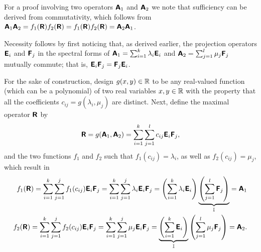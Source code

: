 {%
For a proof involving two operators $\textsf{\textbf{A}}_1$ and $\textsf{\textbf{A}}_2$ we note that
sufficiency  can be derived from   commutativity, which follows from
$
\textsf{\textbf{A}}_1\textsf{\textbf{A}}_2=f_1 (\textsf{\textbf{R}}) f_2 (\textsf{\textbf{R}}) =
f_1 (\textsf{\textbf{R}}) f_2 (\textsf{\textbf{R}})= \textsf{\textbf{A}}_2\textsf{\textbf{A}}_1
$.

Necessity follows by first noticing that, as derived earlier, the projection operators
$\textsf{\textbf{E}}_i$ and $\textsf{\textbf{F}}_j$
in the spectral forms of $\textsf{\textbf{A}}_1=\sum_{i=1}^k \lambda_i\textsf{\textbf{E}}_i$
and
$\textsf{\textbf{A}}_2=\sum_{j=1}^l \mu_j\textsf{\textbf{F}}_j$ mutually commute; that is,
$
\textsf{\textbf{E}}_i \textsf{\textbf{F}}_j
=
\textsf{\textbf{F}}_j \textsf{\textbf{E}}_i
$.

For the sake of construction, design $g(x,y)\in {\Bbb R}$ to be any real-valued function (which can be a polynomial) of two real variables $x,y \in {\Bbb R}$ with the property
that all the coefficients  $c_{ij} = g( \lambda_i,\mu_j )$ are distinct.
Next, define  the maximal operator $\textsf{\textbf{R}}$ by
\begin{equation}
\textsf{\textbf{R}} = g(\textsf{\textbf{A}}_1, \textsf{\textbf{A}}_2) =  \sum_{i=1}^k \sum_{j=1}^l c_{ij}  \textsf{\textbf{E}}_i\textsf{\textbf{F}}_j,
\end{equation}
and the two functions $f_1$ and $f_2$ such that
$f_1(c_{ij}) = \lambda_i$, as well as
$f_2(c_{ij}) = \mu_j$, which result in
\begin{equation}
\begin{split}
f_1(\textsf{\textbf{R}}) = \sum_{i=1}^k \sum_{j=1}^j f_1(c_{ij})  \textsf{\textbf{E}}_i\textsf{\textbf{F}}_j = \sum_{i=1}^k \sum_{j=1}^j \lambda_i  \textsf{\textbf{E}}_i\textsf{\textbf{F}}_j
= \left( \sum_{i=1}^k \lambda_i \textsf{\textbf{E}}_i\right) \underbrace{\left(\sum_{j=1}^l \textsf{\textbf{F}}_j\right)}_{\Bbb I} = \textsf{\textbf{A}}_1
\\
f_2(\textsf{\textbf{R}}) = \sum_{i=1}^k \sum_{j=1}^j f_2(c_{ij})  \textsf{\textbf{E}}_i\textsf{\textbf{F}}_j = \sum_{i=1}^k \sum_{j=1}^j \mu_j  \textsf{\textbf{E}}_i\textsf{\textbf{F}}_j
= \underbrace{\left(\sum_{i=1}^k \textsf{\textbf{E}}_i\right)}_{\Bbb I}\left( \sum_{j=1}^l \mu_j \textsf{\textbf{F}}_j\right)  = \textsf{\textbf{A}}_2
.
\end{split}
\end{equation}
}

